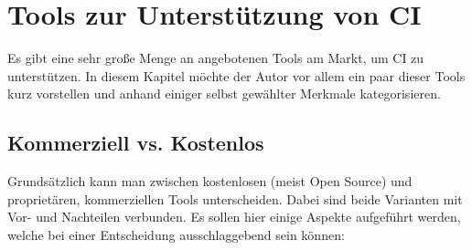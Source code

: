 \pagebreak

\chapter{Tools zur Unterstützung von CI}
Es gibt eine sehr große Menge an angebotenen Tools am Markt, um CI zu unterstützen. In diesem Kapitel möchte der Autor vor allem ein paar dieser Tools kurz vorstellen und anhand einiger selbst gewählter Merkmale kategorisieren.
\section{Kommerziell vs. Kostenlos}
Grundsätzlich kann man zwischen kostenlosen (meist Open Source) und proprietären, kommerziellen Tools unterscheiden. Dabei sind beide Varianten mit Vor- und Nachteilen verbunden. Es sollen hier einige Aspekte aufgeführt werden, welche bei einer Entscheidung ausschlaggebend sein können:
